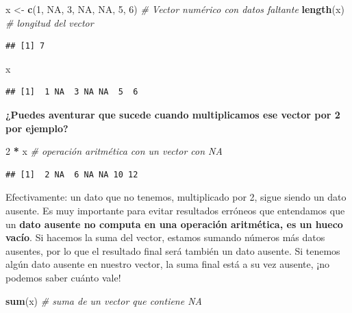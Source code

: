 \documentclass[11pt,]{book}
\newenvironment{Shaded}{\begin{snugshade}}{\end{snugshade}}
\newcommand{\CommentTok}[1]{\textcolor[rgb]{0.37,0.37,0.37}{\textit{#1}}}
\newcommand{\DecValTok}[1]{\textcolor[rgb]{0.06,0.06,0.06}{#1}}
\newcommand{\KeywordTok}[1]{\textcolor[rgb]{0.27,0.27,0.27}{\textbf{#1}}}
\newcommand{\NormalTok}[1]{#1}
\newcommand{\OperatorTok}[1]{\textcolor[rgb]{0.43,0.43,0.43}{\textbf{#1}}}
\newcommand{\OtherTok}[1]{\textcolor[rgb]{0.37,0.37,0.37}{#1}}
\newcommand{\StringTok}[1]{\textcolor[rgb]{0.5,0.5,0.5}{#1}}
\begin{document}
\begin{Shaded}
\begin{Highlighting}[]
\NormalTok{x <-}\StringTok{ }\KeywordTok{c}\NormalTok{(}\DecValTok{1}\NormalTok{, }\OtherTok{NA}\NormalTok{, }\DecValTok{3}\NormalTok{, }\OtherTok{NA}\NormalTok{, }\OtherTok{NA}\NormalTok{, }\DecValTok{5}\NormalTok{, }\DecValTok{6}\NormalTok{) }\CommentTok{# Vector numérico con datos faltante}
\KeywordTok{length}\NormalTok{(x) }\CommentTok{# longitud del vector}
\end{Highlighting}
\end{Shaded}

\begin{verbatim}
## [1] 7
\end{verbatim}

\begin{Shaded}
\begin{Highlighting}[]
\NormalTok{x}
\end{Highlighting}
\end{Shaded}

\begin{verbatim}
## [1]  1 NA  3 NA NA  5  6
\end{verbatim}

\textbf{¿Puedes aventurar que sucede cuando multiplicamos ese vector por 2 por ejemplo?}

\begin{Shaded}
\begin{Highlighting}[]
\DecValTok{2} \OperatorTok{*}\StringTok{ }\NormalTok{x }\CommentTok{# operación aritmética con un vector con NA}
\end{Highlighting}
\end{Shaded}

\begin{verbatim}
## [1]  2 NA  6 NA NA 10 12
\end{verbatim}

Efectivamente: un dato que no tenemos, multiplicado por 2, sigue siendo un dato ausente. Es muy importante para evitar resultados erróneos que entendamos que un \textbf{dato ausente no computa en una operación aritmética, es un hueco vacío}. Si hacemos la suma del vector, estamos sumando números más datos ausentes, por lo que el resultado final será también un dato ausente. Si tenemos algún dato ausente en nuestro vector, la suma final está a su vez ausente, ¡no podemos saber cuánto vale!

\begin{Shaded}
\begin{Highlighting}[]
\KeywordTok{sum}\NormalTok{(x) }\CommentTok{# suma de un vector que contiene NA}
\end{Highlighting}
\end{Shaded}
\end{document}
